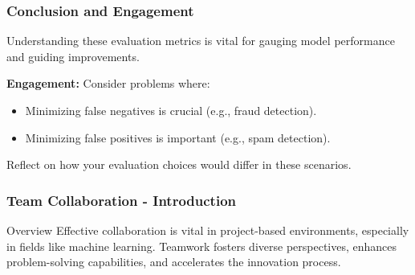 \documentclass[aspectratio=169]{beamer}
\begin{document}
\begin{frame}[fragile]
    \frametitle{Conclusion and Engagement}
    Understanding these evaluation metrics is vital for gauging model performance and guiding improvements. 

    \textbf{Engagement:} Consider problems where:
    \begin{itemize}
        \item Minimizing false negatives is crucial (e.g., fraud detection).
        \item Minimizing false positives is important (e.g., spam detection).
    \end{itemize}
    Reflect on how your evaluation choices would differ in these scenarios.
\end{frame}

\begin{frame}[fragile]
    \frametitle{Team Collaboration - Introduction}
    \begin{block}{Overview}
        Effective collaboration is vital in project-based environments, especially in fields like machine learning. 
        Teamwork fosters diverse perspectives, enhances problem-solving capabilities, and accelerates the innovation process.
    \end{block}
\end{frame}
\end{document}
